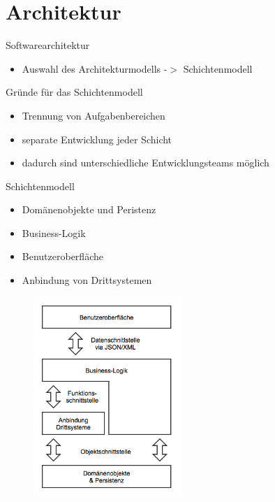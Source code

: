 \documentclass{beamer}
\begin{document}
\section{Architektur}
\begin{frame}{Softwarearchitektur}
	\begin{itemize}
		\item Auswahl des Architekturmodells -$>$ Schichtenmodell
	\end{itemize}
	\begin{block}{Gründe für das Schichtenmodell}
		\begin{itemize}
			\item Trennung von Aufgabenbereichen
			\item separate Entwicklung jeder Schicht
			\item dadurch sind unterschiedliche Entwicklungsteams möglich
		\end{itemize}
	\end{block}
\end{frame}

\begin{frame}{Schichtenmodell}
	\begin{itemize}
		\item Domänenobjekte und Peristenz
		\item Business-Logik
		\item Benutzeroberfläche
		\item Anbindung von Drittsystemen
	\end{itemize}
\end{frame}

\begin{frame}
	\begin{figure}[H]
		\centering	
		\includegraphics[width=0.5\textwidth]{img/architektur.png}
	\end{figure}
\end{frame}
\end{document}
